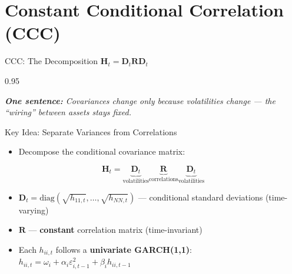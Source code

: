 \documentclass[9pt, aspectratio=169, t]{beamer}
\begin{document}
\section{Constant Conditional Correlation (CCC)}

\begin{frame}{CCC: The Decomposition $\mathbf{H}_t = \mathbf{D}_t \mathbf{R} \mathbf{D}_t$}
    \begin{cminipage}{0.95\textwidth}
    {\footnotesize
    \textit{\textbf{One sentence:} Covariances change only because volatilities change --- the ``wiring'' between assets stays fixed.}
    \vspace{0.2cm}
    \begin{block}{Key Idea: Separate Variances from Correlations}
        \begin{itemize}\setlength{\itemsep}{0pt}
            \item Decompose the conditional covariance matrix:
        \end{itemize}
        \[
            \mathbf{H}_t = \underbrace{\mathbf{D}_t}_{\text{volatilities}} \underbrace{\mathbf{R}}_{\text{correlations}} \underbrace{\mathbf{D}_t}_{\text{volatilities}}
        \]
        \begin{itemize}\setlength{\itemsep}{0pt}
            \item $\mathbf{D}_t = \text{diag}(\sqrt{h_{11,t}}, \ldots, \sqrt{h_{NN,t}})$ --- conditional standard deviations (time-varying)
            \item $\mathbf{R}$ --- \textbf{constant} correlation matrix (time-invariant)
            \item Each $h_{ii,t}$ follows a \textbf{univariate GARCH(1,1)}:
                $h_{ii,t} = \omega_i + \alpha_i \varepsilon_{i,t-1}^2 + \beta_i h_{ii,t-1}$
        \end{itemize}
    \end{block}
    }
    \end{cminipage}
\end{frame}
\end{document}
